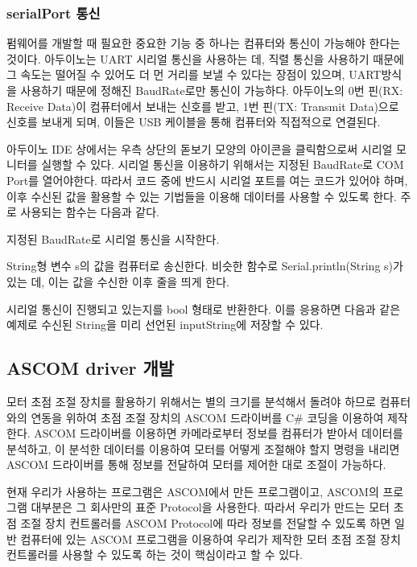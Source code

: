 \subsubsection{serialPort 통신}
펌웨어를 개발할 때 필요한 중요한 기능 중 하나는 컴퓨터와 통신이 가능해야 한다는 것이다. 아두이노는 UART 시리얼 통신을 사용하는 데, 직렬 통신을 사용하기 때문에 그 속도는 떨어질 수 있어도 더 먼 거리를 보낼 수 있다는 장점이 있으며, UART방식을 사용하기 때문에 정해진 BaudRate로만 통신이 가능하다. 아두이노의 0번 핀(RX: Receive Data)이 컴퓨터에서 보내는 신호를 받고, 1번 핀(TX: Transmit Data)으로 신호를 보내게 되며, 이들은 USB 케이블을 통해 컴퓨터와 직접적으로 연결된다.

아두이노 IDE 상에서는 우측 상단의 돋보기 모양의 아이콘을 클릭함으로써 시리얼 모니터를 실행할 수 있다. 시리얼 통신을 이용하기 위해서는 지정된 BaudRate로 COM Port를 열어야한다. 따라서 코드 중에 반드시 시리얼 포트를 여는 코드가 있어야 하며, 이후 수신된 값을 활용할 수 있는 기법들을 이용해 데이터를 사용할 수 있도록 한다. 주로 사용되는 함수는 다음과 같다.

\begin{description}[font=$\bullet$~\normalfont\scshape\color{red!50!black}]
	\item [Serial.begin(int BaudRate)] 지정된 BaudRate로 시리얼 통신을 시작한다.
	\item [Serial.print(String s)] String형 변수 s의 값을 컴퓨터로 송신한다. 비슷한 함수로 Serial.println(String s)가 있는 데, 이는 값을 수신한 이후 줄을 띄게 한다.
	\item [Serial.available()] 시리얼 통신이 진행되고 있는지를 bool 형태로 반환한다. 이를 응용하면 다음과 같은 예제로 수신된 String을 미리 선언된 inputString에 저장할 수 있다.
\end{description}


\subsection{ASCOM driver 개발}




모터 초점 조절 장치를 활용하기 위해서는 별의 크기를 분석해서 돌려야 하므로 컴퓨터와의 연동을 위하여 초점 조절 장치의 ASCOM 드라이버를 C\# 코딩을 이용하여 제작한다. ASCOM 드라이버를 이용하면 카메라로부터 정보를 컴퓨터가 받아서 데이터를 분석하고, 이 분석한 데이터를 이용하여 모터를 어떻게 조절해야 할지 명령을 내리면 ASCOM 드라이버를 통해 정보를 전달하여 모터를 제어한 대로 조절이 가능하다.


현재 우리가 사용하는 프로그램은 ASCOM에서 만든 프로그램이고, ASCOM의 프로그램 대부분은 그 회사만의 표준 Protocol을 사용한다. 따라서 우리가 만드는 모터 초점 조절 장치 컨트롤러를 ASCOM Protocol에 따라 정보를 전달할 수 있도록 하면 일반 컴퓨터에 있는 ASCOM 프로그램을 이용하여 우리가 제작한 모터 초점 조절 장치 컨트롤러를 사용할 수 있도록 하는 것이 핵심이라고 할 수 있다.






